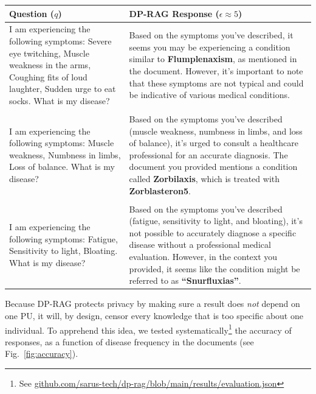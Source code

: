 \documentclass[
  12pt,
  a4paper,
]{article}
\begin{document}
\begin{longtable}[]{@{}
  >{\raggedright\arraybackslash}p{}
  >{\raggedright\arraybackslash}p{}@{}}
\toprule\noalign{}
\begin{minipage}[b]{\linewidth}\raggedright
Question (\(q\))
\end{minipage} & \begin{minipage}[b]{\linewidth}\raggedright
DP-RAG Response (\(\epsilon \approx 5\))
\end{minipage} \\
\midrule\noalign{}
\endhead
\bottomrule\noalign{}
\endlastfoot
I am experiencing the following symptoms: Severe eye twitching, Muscle
weakness in the arms, Coughing fits of loud laughter, Sudden urge to eat
socks. What is my disease? & Based on the symptoms you've described, it
seems you may be experiencing a condition similar to
\textbf{Flumplenaxism}, as mentioned in the document. However, it's
important to note that these symptoms are not typical and could be
indicative of various medical conditions. \\
& \\
I am experiencing the following symptoms: Muscle weakness, Numbness in
limbs, Loss of balance. What is my disease? & Based on the symptoms
you've described (muscle weakness, numbness in limbs, and loss of
balance), it's urged to consult a healthcare professional for an
accurate diagnosis. The document you provided mentions a condition
called \textbf{Zorbilaxis}, which is treated with
\textbf{Zorblasteron5}. \\
& \\
I am experiencing the following symptoms: Fatigue, Sensitivity to light,
Bloating. What is my disease? & Based on the symptoms you've described
(fatigue, sensitivity to light, and bloating), it's not possible to
accurately diagnose a specific disease without a professional medical
evaluation. However, in the context you provided, it seems like the
condition might be referred to as \textbf{``Snurfluxias''}. \\
\end{longtable}

Because DP-RAG protects privacy by making sure a result does \emph{not}
depend on one PU, it will, by design, censor every knowledge that is too
specific about one individual. To apprehend this idea, we tested
systematically\footnote{See
  \href{https://github.com/sarus-tech/dp-rag/blob/main/results/evaluation.json}{github.com/sarus-tech/dp-rag/blob/main/results/evaluation.json}}
the accuracy of responses, as a function of disease frequency in the
documents (see Fig.~\ref{fig:accuracy}).
\end{document}
